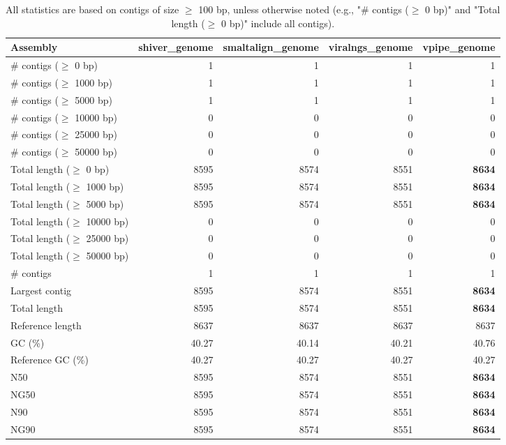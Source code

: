 \documentclass[12pt,a4paper]{article}
\begin{document}
\begin{table}[ht]
\begin{center}
\caption{All statistics are based on contigs of size $\geq$ 100 bp, unless otherwise noted (e.g., "\# contigs ($\geq$ 0 bp)" and "Total length ($\geq$ 0 bp)" include all contigs).}
\begin{tabular}{|l*{4}{|r}|}
\hline
Assembly & shiver\_genome & smaltalign\_genome & viralngs\_genome & vpipe\_genome \\ \hline
\# contigs ($\geq$ 0 bp) & 1 & 1 & 1 & 1 \\ \hline
\# contigs ($\geq$ 1000 bp) & 1 & 1 & 1 & 1 \\ \hline
\# contigs ($\geq$ 5000 bp) & 1 & 1 & 1 & 1 \\ \hline
\# contigs ($\geq$ 10000 bp) & 0 & 0 & 0 & 0 \\ \hline
\# contigs ($\geq$ 25000 bp) & 0 & 0 & 0 & 0 \\ \hline
\# contigs ($\geq$ 50000 bp) & 0 & 0 & 0 & 0 \\ \hline
Total length ($\geq$ 0 bp) & 8595 & 8574 & 8551 & {\bf 8634} \\ \hline
Total length ($\geq$ 1000 bp) & 8595 & 8574 & 8551 & {\bf 8634} \\ \hline
Total length ($\geq$ 5000 bp) & 8595 & 8574 & 8551 & {\bf 8634} \\ \hline
Total length ($\geq$ 10000 bp) & 0 & 0 & 0 & 0 \\ \hline
Total length ($\geq$ 25000 bp) & 0 & 0 & 0 & 0 \\ \hline
Total length ($\geq$ 50000 bp) & 0 & 0 & 0 & 0 \\ \hline
\# contigs & 1 & 1 & 1 & 1 \\ \hline
Largest contig & 8595 & 8574 & 8551 & {\bf 8634} \\ \hline
Total length & 8595 & 8574 & 8551 & {\bf 8634} \\ \hline
Reference length & 8637 & 8637 & 8637 & 8637 \\ \hline
GC (\%) & 40.27 & 40.14 & 40.21 & 40.76 \\ \hline
Reference GC (\%) & 40.27 & 40.27 & 40.27 & 40.27 \\ \hline
N50 & 8595 & 8574 & 8551 & {\bf 8634} \\ \hline
NG50 & 8595 & 8574 & 8551 & {\bf 8634} \\ \hline
N90 & 8595 & 8574 & 8551 & {\bf 8634} \\ \hline
NG90 & 8595 & 8574 & 8551 & {\bf 8634} \\ \hline

\end{tabular}
\end{center}
\end{table}
\end{document}
